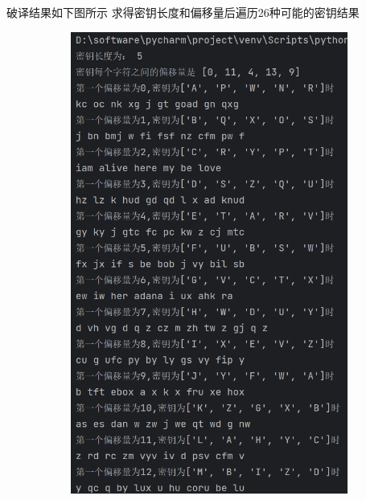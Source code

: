         破译结果如下图所示
        求得密钥长度和偏移量后遍历26种可能的密钥结果
        \begin{figure}[htbp]
            \centering 
            \begin{subfigure}[b]{0.4\textwidth}
                \includegraphics[width=\textwidth]{images/vigenere2_result2_1.1.png}
                \label{fig:subfig1}
            \end{subfigure}
            \hfill
            \begin{subfigure}[b]{0.4\textwidth}

\end{subfigure}
\end{figure}
